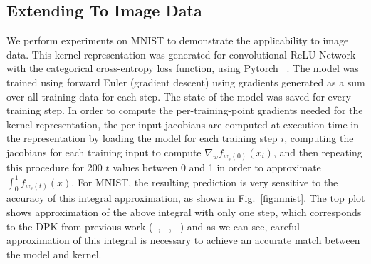 \subsection{Extending To Image Data}
    We perform experiments on MNIST to demonstrate the applicability to image data. 
    This kernel representation was generated for convolutional ReLU Network with the categorical cross-entropy loss function, using Pytorch ~\cite{pytorch}. 
    The model was trained using forward Euler (gradient descent) using gradients generated as a sum over all training data for each step. 
    The state of the model was saved for every training step. In order to compute the per-training-point gradients needed for the kernel representation, the per-input jacobians are computed at execution time in the representation by loading the model for each training step $i$, computing the jacobians for each training input to compute $\nabla_w f_{w_s(0)}(x_i)$, and then repeating this procedure for 200 $t$ values between 0 and 1 in order to approximate $\int_0^1 f_{w_s(t)}(x)$. For MNIST, the resulting prediction is very sensitive to the accuracy of this integral approximation, as shown in Fig.~\ref{fig:mnist}. The top plot shows approximation of the above integral with only one step, which corresponds to the DPK from previous work (~\cite{chen2021equivalence}, ~\cite{domingos2020}, ~\cite{incudini2022quantum}) and as we can see, careful approximation of this integral is necessary to achieve an accurate match between the model and kernel. 

